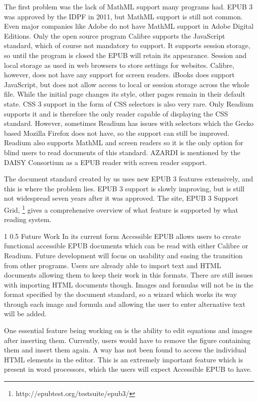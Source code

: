 \documentclass{llncs}
\makeatletter
\renewcommand\section{\@startsection 
   {section}{1}{0mm}%
   {1\baselineskip}%
   {0.5\baselineskip}%
   {\bfseries\Large}%
   }
\makeatother
\begin{document}
The first problem was the lack of MathML support many programs had. EPUB 3 was approved by the IDPF in 2011, but MathML support is still not common. Even major companies like Adobe do not have MathML support in Adobe Digital Editions. Only the open source program Calibre supports the JavaScript standard, which of course not mandatory to support. It supports session storage, so until the program is closed the EPUB will retain its appearance. Session and local storage as used in web browsers to store settings for websites. Calibre, however, does not have any support for screen readers.  iBooks does support JavaScript, but does not allow access to local or session storage across the whole file. While the initial page changes its style, other pages remain in their default state.
CSS 3 support in the form of CSS selectors is also very rare. Only Readium supports it and is therefore the only reader capable of displaying the CSS standard. However, sometimes Readium has issues with selectors which the Gecko based Mozilla Firefox does not have, so the support can still be improved. Readium also supports MathML and screen readers so it is the only option for blind users to read documents of this standard. 
AZARDI is mentioned by the DAISY Consortium as a EPUB reader with screen reader support. 

The document standard created by us uses new EPUB 3 features extensively, and this is where the problem lies. EPUB 3 support is slowly improving, but is still not widespread seven years after it was approved. The site, EPUB 3 Support Grid, \footnote{http://epubtest.org/testsuite/epub3/} gives a comprehensive overview of what feature is supported by what reading system. 

\section{Future Work}
In its current form Accessible EPUB allows users to create functional accessible EPUB documents which can be read with either Calibre or Readium. Future development will focus on usability and easing the transition from other programs. Users are already able to import text and HTML documents allowing them to keep their work in this formats. There are still issues with importing HTML documents though. Images and formulas will not be in the format specified by the document standard, so a wizard which works its way through each image and formula and allowing the user to enter alternative text will be added.  

One essential feature being working on is the ability to edit equations and images after inserting them. Currently, users would have to remove the figure containing them and insert them again. A way has not been found to access the individual HTML elements in the editor. This is an extremely important feature which is present in word processors, which the users will expect Accessible EPUB to have. 
\end{document}
